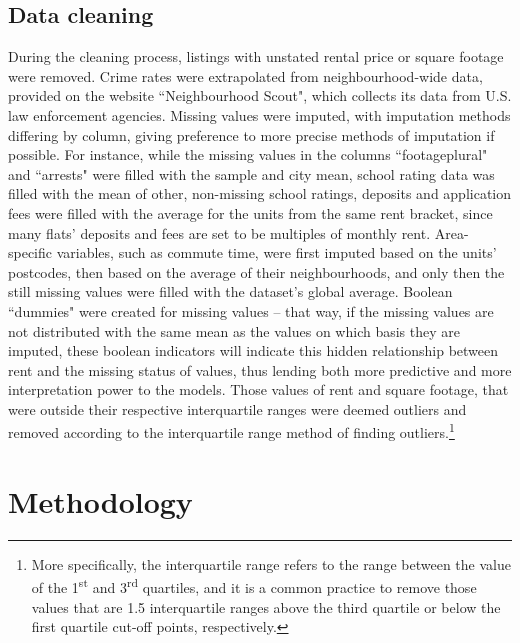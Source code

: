 \documentclass[12pt]{report}
\begin{document}
\subsection{Data cleaning}
During the cleaning process, listings with unstated rental price or square footage were removed. Crime rates were extrapolated from neighbourhood-wide data, provided on the website ``Neighbourhood Scout", which collects its data from U.S. law enforcement agencies. Missing values were imputed, with imputation methods differing by column, giving preference to more precise methods of imputation if possible. For instance, while the missing values in the columns ``footageplural" and ``arrests" were filled with the sample and city mean, school rating data was filled with the mean of other, non-missing school ratings, deposits and application fees were filled with the average for the units from the same rent bracket, since many flats' deposits and fees are set to be multiples of monthly rent. Area-specific variables, such as commute time, were first imputed based on the units' postcodes, then based on the average of their neighbourhoods, and only then the still missing values were filled with the dataset's global average. Boolean ``dummies" were created for missing values -- that way, if the missing values are not distributed with the same mean as the values on which basis they are imputed, these boolean indicators will indicate this hidden relationship between rent and the missing status of values, thus lending both more predictive and more interpretation power to the models.
Those values of rent and square footage, that were outside their respective interquartile ranges were deemed outliers and removed according to the interquartile range method of finding outliers.\footnote{More specifically, the interquartile range refers to the range between the value of the 1\textsuperscript{st} and 3\textsuperscript{rd} quartiles, and it is a common practice to remove those values that are 1.5 interquartile ranges above the third quartile or below the first quartile cut-off points, respectively.}

\section{Methodology}
\end{document}

